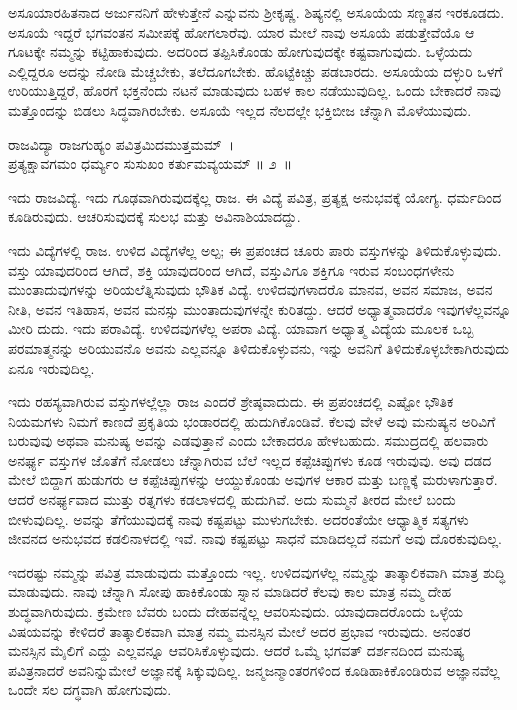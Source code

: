 ಅಸೂಯಾರಹಿತನಾದ ಅರ್ಜುನನಿಗೆ ಹೇಳುತ್ತೇನೆ ಎನ್ನುವನು ಶ‍್ರೀಕೃಷ್ಣ. ಶಿಷ್ಯನಲ್ಲಿ ಅಸೂಯೆಯ ಸಣ್ಣತನ ಇರಕೂಡದು. ಅಸೂಯೆ ಇದ್ದರೆ ಭಗವಂತನ ಸಮೀಪಕ್ಕೆ ಹೋಗಲಾರೆವು. ಯಾರ ಮೇಲೆ ನಾವು ಅಸೂಯೆ ಪಡುತ್ತೇವೆಯೊ ಆ ಗೂಟಕ್ಕೇ ನಮ್ಮನ್ನು ಕಟ್ಟಿಹಾಕುವುದು. ಅದರಿಂದ ತಪ್ಪಿಸಿಕೊಂಡು ಹೋಗುವುದಕ್ಕೇ ಕಷ್ಟವಾಗುವುದು. ಒಳ್ಳೆಯದು ಎಲ್ಲಿದ್ದರೂ ಅದನ್ನು ನೋಡಿ ಮೆಚ್ಚಬೇಕು, ತಲೆದೂಗಬೇಕು. ಹೊಟ್ಟೆಕಿಚ್ಚು ಪಡಬಾರದು. ಅಸೂಯೆಯ ದಳ್ಳುರಿ ಒಳಗೆ ಉರಿಯುತ್ತಿದ್ದರೆ, ಹೊರಗೆ ಭಕ್ತನೆಂದು ನಟನೆ ಮಾಡುವುದು ಬಹಳ ಕಾಲ ನಡೆಯುವುದಿಲ್ಲ. ಒಂದು ಬೇಕಾದರೆ ನಾವು ಮತ್ತೊಂದನ್ನು ಬಿಡಲು ಸಿದ್ಧವಾಗಿರಬೇಕು. ಅಸೂಯೆ ಇಲ್ಲದ ನೆಲದಲ್ಲೇ ಭಕ್ತಿಬೀಜ ಚೆನ್ನಾಗಿ ಮೊಳೆಯುವುದು.

\begin{shloka}
ರಾಜವಿದ್ಯಾ ರಾಜಗುಹ್ಯಂ ಪವಿತ್ರಮಿದಮುತ್ತಮಮ್~।\\ಪ್ರತ್ಯಕ್ಷಾವಗಮಂ ಧರ್ಮ್ಯಂ ಸುಸುಖಂ ಕರ್ತುಮವ್ಯಯಮ್ \hfill॥ ೨~॥
\end{shloka}

\begin{artha}
ಇದು ರಾಜವಿದ್ಯೆ. ಇದು ಗೂಢವಾಗಿರುವುದಕ್ಕೆಲ್ಲ ರಾಜ. ಈ ವಿದ್ಯೆ ಪವಿತ್ರ, ಪ್ರತ್ಯಕ್ಷ ಅನುಭವಕ್ಕೆ ಯೋಗ್ಯ. ಧರ್ಮದಿಂದ ಕೂಡಿರುವುದು. ಆಚರಿಸುವುದಕ್ಕೆ ಸುಲಭ ಮತ್ತು ಅವಿನಾಶಿಯಾದದ್ದು.
\end{artha}

ಇದು ವಿದ್ಯೆಗಳಲ್ಲಿ ರಾಜ. ಉಳಿದ ವಿದ್ಯೆಗಳೆಲ್ಲ ಅಲ್ಪ; ಈ ಪ್ರಪಂಚದ ಚೂರು ಪಾರು ವಸ್ತುಗಳನ್ನು ತಿಳಿದುಕೊಳ್ಳುವುದು. ವಸ್ತು ಯಾವುದರಿಂದ ಆಗಿದೆ, ಶಕ್ತಿ ಯಾವುದರಿಂದ ಆಗಿದೆ, ವಸ್ತುವಿಗೂ ಶಕ್ತಿಗೂ ಇರುವ ಸಂಬಂಧಗಳೇನು ಮುಂತಾದುವುಗಳನ್ನು ಅರಿಯಲೆತ್ನಿಸುವುದು ಭೌತಿಕ ವಿದ್ಯೆ. ಉಳಿದವುಗಳಾದರೊ ಮಾನವ, ಅವನ ಸಮಾಜ, ಅವನ ನೀತಿ, ಅವನ ಇತಿಹಾಸ, ಅವನ ಮನಸ್ಸು ಮುಂತಾದುವುಗಳನ್ನೇ ಕುರಿತದ್ದು. ಆದರೆ ಅಧ್ಯಾತ್ಮವಾದರೊ ಇವುಗಳೆಲ್ಲವನ್ನೂ ಮೀರಿ ದುದು. ಇದು ಪರಾವಿದ್ಯೆ. ಉಳಿದವುಗಳೆಲ್ಲ ಅಪರಾ ವಿದ್ಯೆ. ಯಾವಾಗ ಅಧ್ಯಾತ್ಮ ವಿದ್ಯೆಯ ಮೂಲಕ ಒಬ್ಬ ಪರಮಾತ್ಮನನ್ನು ಅರಿಯುವನೊ ಅವನು ಎಲ್ಲವನ್ನೂ ತಿಳಿದುಕೊಳ್ಳುವನು, ಇನ್ನು ಅವನಿಗೆ ತಿಳಿದುಕೊಳ್ಳಬೇಕಾಗಿರುವುದು ಏನೂ ಇರುವುದಿಲ್ಲ.

ಇದು ರಹಸ್ಯವಾಗಿರುವ ವಸ್ತುಗಳಲ್ಲೆಲ್ಲಾ ರಾಜ ಎಂದರೆ ಶ್ರೇಷ್ಠವಾದುದು. ಈ ಪ್ರಪಂಚದಲ್ಲಿ ಎಷ್ಟೋ ಭೌತಿಕ ನಿಯಮಗಳು ನಿಮಗೆ ಕಾಣದೆ ಪ್ರಕೃತಿಯ ಭಂಡಾರದಲ್ಲಿ ಹುದುಗಿಕೊಂಡಿವೆ. ಕೆಲವು ವೇಳೆ ಅವು ಮನುಷ್ಯನ ಅರಿವಿಗೆ ಬರುವುವು ಅಥವಾ ಮನುಷ್ಯ ಅವನ್ನು ಎಡವುತ್ತಾನೆ ಎಂದು ಬೇಕಾದರೂ ಹೇಳಬಹುದು. ಸಮುದ್ರದಲ್ಲಿ ಹಲವಾರು ಅನರ್ಘ್ಯ ವಸ್ತುಗಳ ಜೊತೆಗೆ ನೋಡಲು ಚೆನ್ನಾಗಿರುವ ಬೆಲೆ ಇಲ್ಲದ ಕಪ್ಪೆಚಿಪ್ಪುಗಳು ಕೂಡ ಇರುವುವು. ಅವು ದಡದ ಮೇಲೆ ಬಿದ್ದಾಗ ಹುಡುಗರು ಆ ಕಪ್ಪೆಚಿಪ್ಪುಗಳನ್ನು ಆಯ್ದುಕೊಂಡು ಅವುಗಳ ಆಕಾರ ಮತ್ತು ಬಣ್ಣಕ್ಕೆ ಮರುಳಾಗುತ್ತಾರೆ. ಆದರೆ ಅನರ್ಘ್ಯವಾದ ಮುತ್ತು ರತ್ನಗಳು ಕಡಲಾಳದಲ್ಲಿ ಹುದುಗಿವೆ. ಅದು ಸುಮ್ಮನೆ ತೀರದ ಮೇಲೆ ಬಂದು ಬೀಳುವುದಿಲ್ಲ. ಅವನ್ನು ತೆಗೆಯುವುದಕ್ಕೆ ನಾವು ಕಷ್ಟಪಟ್ಟು ಮುಳುಗಬೇಕು. ಅದರಂತೆಯೇ ಆಧ್ಯಾತ್ಮಿಕ ಸತ್ಯಗಳು ಜೀವನದ ಅನುಭವದ ಕಡಲಿನಾಳದಲ್ಲಿ ಇವೆ. ನಾವು ಕಷ್ಟಪಟ್ಟು ಸಾಧನೆ ಮಾಡಿದಲ್ಲದೆ ನಮಗೆ ಅವು ದೊರಕುವುದಿಲ್ಲ.

ಇದರಷ್ಟು ನಮ್ಮನ್ನು ಪವಿತ್ರ ಮಾಡುವುದು ಮತ್ತೊಂದು ಇಲ್ಲ. ಉಳಿದವುಗಳೆಲ್ಲ ನಮ್ಮನ್ನು ತಾತ್ಕಾಲಿಕವಾಗಿ ಮಾತ್ರ ಶುದ್ಧಿ ಮಾಡುವುದು. ನಾವು ಚೆನ್ನಾಗಿ ಸೋಪು ಹಾಕಿಕೊಂಡು ಸ್ನಾನ ಮಾಡಿದರೆ ಕೆಲವು ಕಾಲ ಮಾತ್ರ ನಮ್ಮ ದೇಹ ಶುದ್ಧವಾಗಿರುವುದು. ಕ್ರಮೇಣ ಬೆವರು ಬಂದು ದೇಹವನ್ನೆಲ್ಲ ಆವರಿಸುವುದು. ಯಾವುದಾದರೊಂದು ಒಳ್ಳೆಯ ವಿಷಯವನ್ನು ಕೇಳಿದರೆ ತಾತ್ಕಾಲಿಕವಾಗಿ ಮಾತ್ರ ನಮ್ಮ ಮನಸ್ಸಿನ ಮೇಲೆ ಅದರ ಪ್ರಭಾವ ಇರುವುದು. ಅನಂತರ ಮನಸ್ಸಿನ ಮೈಲಿಗೆ ಎದ್ದು ಎಲ್ಲವನ್ನೂ ಆವರಿಸಿಕೊಳ್ಳುವುದು. ಆದರೆ ಒಮ್ಮೆ ಭಗವತ್ ದರ್ಶನದಿಂದ ಮನುಷ್ಯ ಪವಿತ್ರನಾದರೆ ಅವನಿನ್ನುಮೇಲೆ ಅಜ್ಞಾನಕ್ಕೆ ಸಿಕ್ಕುವುದಿಲ್ಲ. ಜನ್ಮಜನ್ಮಾಂತರಗಳಿಂದ ಕೂಡಿಹಾಕಿಕೊಂಡಿರುವ ಅಜ್ಞಾನವೆಲ್ಲ ಒಂದೇ ಸಲ ದಗ್ಧವಾಗಿ ಹೋಗುವುದು.


